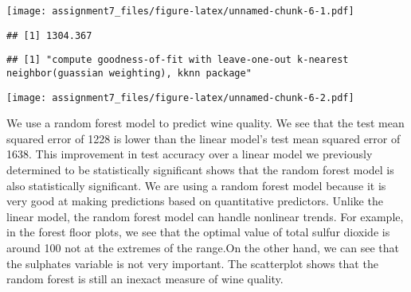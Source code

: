 \documentclass[]{article}
\newenvironment{Shaded}{\begin{snugshade}}{\end{snugshade}}
\newcommand{\KeywordTok}[1]{\textcolor[rgb]{0.13,0.29,0.53}{\textbf{#1}}}
\newcommand{\DataTypeTok}[1]{\textcolor[rgb]{0.13,0.29,0.53}{#1}}
\newcommand{\DecValTok}[1]{\textcolor[rgb]{0.00,0.00,0.81}{#1}}
\newcommand{\StringTok}[1]{\textcolor[rgb]{0.31,0.60,0.02}{#1}}
\newcommand{\CommentTok}[1]{\textcolor[rgb]{0.56,0.35,0.01}{\textit{#1}}}
\newcommand{\OtherTok}[1]{\textcolor[rgb]{0.56,0.35,0.01}{#1}}
\newcommand{\OperatorTok}[1]{\textcolor[rgb]{0.81,0.36,0.00}{\textbf{#1}}}
\newcommand{\NormalTok}[1]{#1}
\begin{document}
\texttt{[image: assignment7\_files/figure-latex/unnamed-chunk-6-1.pdf]}

\begin{Shaded}
\end{Shaded}

\begin{verbatim}
## [1] 1304.367
\end{verbatim}

\begin{Shaded}
\end{Shaded}

\begin{verbatim}
## [1] "compute goodness-of-fit with leave-one-out k-nearest neighbor(guassian weighting), kknn package"
\end{verbatim}

\texttt{[image: assignment7\_files/figure-latex/unnamed-chunk-6-2.pdf]}

We use a random forest model to predict wine quality. We see that the
test mean squared error of 1228 is lower than the linear model's test
mean squared error of 1638. This improvement in test accuracy over a
linear model we previously determined to be statistically significant
shows that the random forest model is also statistically significant. We
are using a random forest model because it is very good at making
predictions based on quantitative predictors. Unlike the linear model,
the random forest model can handle nonlinear trends. For example, in the
forest floor plots, we see that the optimal value of total sulfur
dioxide is around 100 not at the extremes of the range.On the other
hand, we can see that the sulphates variable is not very important. The
scatterplot shows that the random forest is still an inexact measure of
wine quality.
\end{document}
